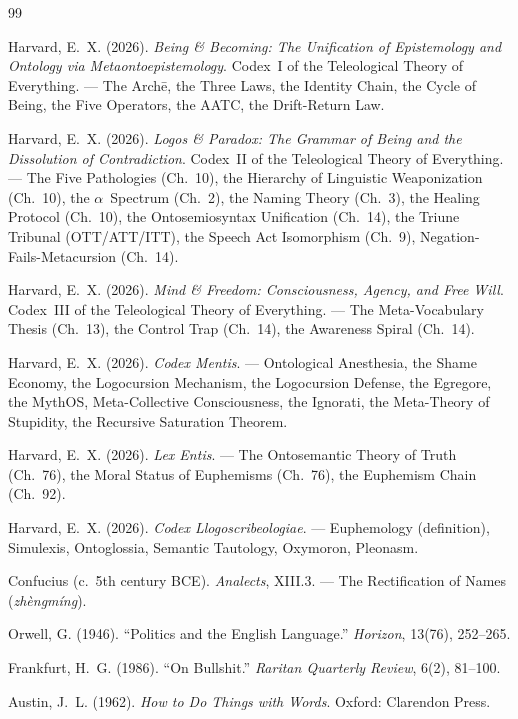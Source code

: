 \documentclass[11pt, oneside]{article}
\theoremstyle{definition}
\begin{document}
\begin{thebibliography}{99}

Harvard, E.~X. (2026).
\textit{Being \& Becoming: The Unification of Epistemology and Ontology via Metaontoepistemology}.
Codex~I of the Teleological Theory of Everything.
--- The Arch\={e}, the Three Laws, the Identity Chain, the Cycle of Being, the Five Operators, the AATC, the Drift-Return Law.

Harvard, E.~X. (2026).
\textit{Logos \& Paradox: The Grammar of Being and the Dissolution of Contradiction}.
Codex~II of the Teleological Theory of Everything.
--- The Five Pathologies (Ch.~10), the Hierarchy of Linguistic Weaponization (Ch.~10), the $\alpha$~Spectrum (Ch.~2), the Naming Theory (Ch.~3), the Healing Protocol (Ch.~10), the Ontosemiosyntax Unification (Ch.~14), the Triune Tribunal (OTT/ATT/ITT), the Speech Act Isomorphism (Ch.~9), Negation-Fails-Metacursion (Ch.~14).

Harvard, E.~X. (2026).
\textit{Mind \& Freedom: Consciousness, Agency, and Free Will}.
Codex~III of the Teleological Theory of Everything.
--- The Meta-Vocabulary Thesis (Ch.~13), the Control Trap (Ch.~14), the Awareness Spiral (Ch.~14).

Harvard, E.~X. (2026).
\textit{Codex Mentis}.
--- Ontological Anesthesia, the Shame Economy, the Logocursion Mechanism, the Logocursion Defense, the Egregore, the MythOS, Meta-Collective Consciousness, the Ignorati, the Meta-Theory of Stupidity, the Recursive Saturation Theorem.

Harvard, E.~X. (2026).
\textit{Lex Entis}.
--- The Ontosemantic Theory of Truth (Ch.~76), the Moral Status of Euphemisms (Ch.~76), the Euphemism Chain (Ch.~92).

Harvard, E.~X. (2026).
\textit{Codex Llogoscribeologiae}.
--- Euphemology (definition), Simulexis, Ontoglossia, Semantic Tautology, Oxymoron, Pleonasm.

Confucius (c.~5th century BCE).
\textit{Analects}, XIII.3.
--- The Rectification of Names (\textit{zh\`{e}ngm\'{i}ng}).

Orwell, G. (1946).
``Politics and the English Language.''
\textit{Horizon}, 13(76), 252--265.

Frankfurt, H.~G. (1986).
``On Bullshit.''
\textit{Raritan Quarterly Review}, 6(2), 81--100.

Austin, J.~L. (1962).
\textit{How to Do Things with Words}.
Oxford: Clarendon Press.


\end{thebibliography}
\end{document}
